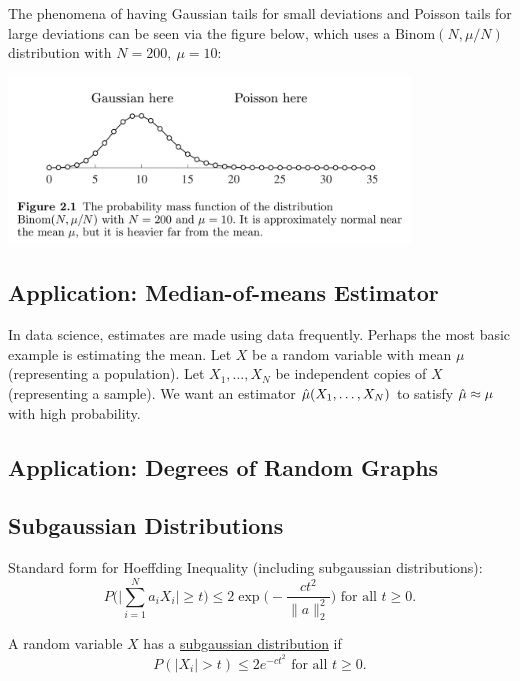 \begin{remark}
The phenomena of having Gaussian tails for small deviations and Poisson tails for large deviations 
can be seen via the figure below, which uses a $\text{Binom}(N, \mu / N)$ distribution with 
$N = 200, \ \mu = 10$:
\begin{center}
	\includegraphics[width=0.8\textwidth]{Chapter 2/fig2-1.png}
\end{center}
\end{remark}


\subsection{Application: Median-of-means Estimator}
In data science, estimates are made using data frequently. Perhaps the most basic example is estimating 
the mean. Let $X$ be a random variable with mean $\mu$ (representing a population). Let $X_1, \dots, X_N$ 
be independent copies of $X$ (representing a sample). We want an estimator $\Hat{\mu}(X_1, \dots, X_N)$ 
to satisfy $\Hat{\mu} \approx \mu$ with high probability.


\subsection{Application: Degrees of Random Graphs}


\subsection{Subgaussian Distributions}
Standard form for Hoeffding Inequality (including subgaussian distributions): 
\[ P \biggl( \bigg| \sum_{i = 1}^{N} a_i X_i \bigg| \geq t \biggr) \leq 
2 \exp{\biggl( -\frac{ct^2}{\|a\|_2^2} \biggr)} \text{ for all } t \geq 0. \]

\begin{definition}[]
\label{def:2.6.1}
A random variable $X$ has a \underline{subgaussian distribution} if 
\[ P(|X_i| > t) \leq 2e^{-ct^2} \text{ for all } t \geq 0. \]
\end{definition}


